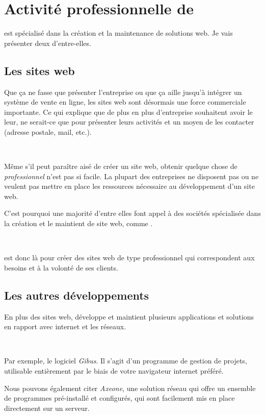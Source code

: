 \chapter{Activité professionnelle de \fidit}
\fidit{} est spécialisé dans la création et la maintenance de solutions web. Je vais présenter deux d'entre-elles.

\section{Les sites web}
Que ça ne fasse que présenter l'entreprise ou que ça aille jusqu'à intégrer un système de vente en ligne, les sites web sont désormais une force commerciale importante. Ce qui explique que de plus en plus d'entreprise souhaitent avoir le leur, ne serait-ce que pour présenter leurs activités et un moyen de les contacter (adresse postale, mail, etc.).

~

Même s'il peut paraître aisé de créer un site web, obtenir quelque chose de \emph{professionnel} n'est pas si facile. La plupart des entreprises ne disposent pas ou ne veulent pas mettre en place les ressources nécessaire au développement d'un site web.

C'est pourquoi une majorité d'entre elles font appel à des sociétés spécialisée dans la création et le maintient de site web, comme \fidit.

~

\fidit{} est donc là pour créer des sites web de type professionnel qui correspondent aux besoins et à la volonté de ses clients.

\section{Les autres développements}
En plus des sites web, \fidit{} développe et maintient plusieurs applications et solutions en rapport avec internet et les réseaux.

~

Par exemple, le logiciel \emph{Gibus}. Il s'agit d'un programme de gestion de projets, utilisable entièrement par le biais de votre navigateur internet préféré.

Nous pouvons également citer \emph{Axeone}, une solution réseau qui offre un ensemble de programmes pré-installé et configurés, qui sont facilement mis en place directement sur un serveur.
